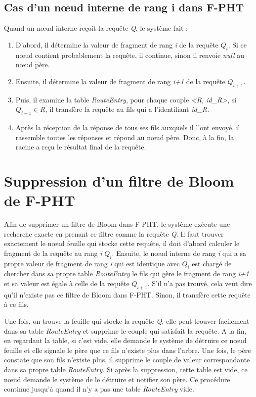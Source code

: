 \documentclass[a4paper,11pt]{report}
\begin{document}
\subsection{Cas d'un nœud interne de rang i dans F-PHT}
	Quand un nœud interne reçoit la requête \textit{Q}, le système fait :
	\begin{enumerate}
		\item D'abord, il détermine la valeur de fragment de rang \textit{i} de la requête \textit{$Q_i$}. Si ce nœud contient probablement la requête, il continue, sinon il renvoie \textit{null} au nœud père.
		\item Ensuite, il détermine la valeur de fragment de rang \textit{i+1} de la requête \textit{$Q_{i+1}$}.
		\item Puis, il examine la table \textit{RouteEntry}, pour chaque couple \textit{<R, id\_R>}, si $Q_{i+1} \in R$, il transfère la requête au fils qui a l'identifiant \textit{id\_R}.
		\item Après la réception de la réponse de tous ses fils auxquels il l'ont envoyé, il rassemble toutes les réponses et répond au nœud père. Donc, à la fin, la racine a reçu le résultat final de la requête.
	\end{enumerate}
	
\section{Suppression d'un filtre de Bloom de F-PHT}
	Afin de supprimer un filtre de Bloom dans F-PHT, le système exécute une recherche exacte en prenant ce filtre comme la requête \textit{Q}. Il faut trouver exactement le nœud feuille qui stocke cette requête, il doit d'abord calculer le fragment de la requête au rang \textit{i} \textit{$Q_i$}. Ensuite, le nœud interne de rang \textit{i} qui a sa propre valeur de fragment de rang \textit{i} qui est identique avec \textit{$Q_i$} est chargé de chercher dans sa propre table \textit{RouteEntry} le fils qui gère le fragment de rang \textit{i+1} et sa valeur est égale à celle de la requête \textit{$Q_{i+1}$}. S'il n'a pas trouvé, cela veut dire qu'il n'existe pas ce filtre de Bloom dans F-PHT. Sinon, il transfère cette requête à ce fils.
	
	Une fois, on trouve la feuille qui stocke la requête \textit{Q}, elle peut trouver facilement dans sa table \textit{RouteEntry} et supprime le couple qui satisfait la requête. A la fin, en regardant la table, si c'est vide, elle demande le système de détruire ce nœud feuille et elle signale le père que ce fils n'existe plus dans l'arbre. Une fois, le père constate que son fils n'existe plus, il supprime le couple de valeur correspondante dans sa propre table \textit{RouteEntry}. Si après la suppression, cette table est vide, ce nœud demande le système de le détruire et notifier son père. Ce procédure continue jusqu'à quand il n'y a pas une table \textit{RouteEntry} vide.
\end{document}
